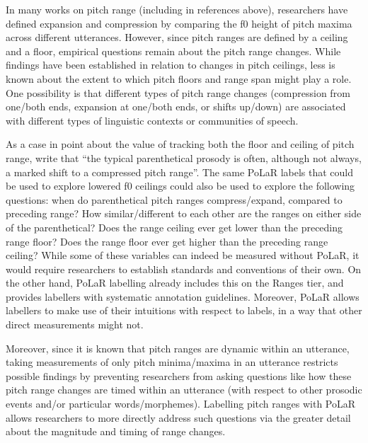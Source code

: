 \documentclass[11pt, twoside]{memoir}
\begin{document}
In many works on pitch range (including in references above), researchers have defined expansion and compression by comparing the f0 height of pitch maxima across different utterances. However, since pitch ranges are defined by a ceiling and a floor, empirical questions remain about the pitch range changes. While findings have been established in relation to changes in pitch ceilings, less is known about the extent to which pitch floors and range span might play a role. One possibility is that different types of pitch range changes (compression from one\slash both ends, expansion at one\slash both ends, or shifts up\slash down) are associated with different types of linguistic contexts or communities of speech.

As a case in point about the value of tracking both the floor and ceiling of pitch range, \citet{dehewichmann10} write that “the typical parenthetical prosody is often, although not always, a marked shift to a compressed pitch range”. The same PoLaR labels that could be used to explore lowered f0 ceilings could also be used to explore the following questions: when do parenthetical pitch ranges compress\slash expand, compared to preceding range? How similar\slash different to each other are the ranges on either side of the parenthetical? Does the range ceiling ever get lower than the preceding range floor? Does the range floor ever get higher than the preceding range ceiling? While some of these variables can indeed be measured without PoLaR, it would require researchers to establish standards and conventions of their own. On the other hand, PoLaR labelling already includes this on the Ranges tier, and provides labellers with systematic annotation guidelines. Moreover, PoLaR allows labellers to make use of their intuitions with respect to labels, in a way that other direct measurements might not. 

Moreover, since it is known that pitch ranges are dynamic within an utterance, taking measurements of only pitch minima\slash maxima in an utterance restricts possible findings by preventing researchers from asking questions like how these pitch range changes are timed within an utterance (with respect to other prosodic events and/or particular words\slash morphemes). Labelling pitch ranges with PoLaR allows researchers to more directly address such questions via the greater detail about the magnitude and timing of range changes.  
\end{document}
